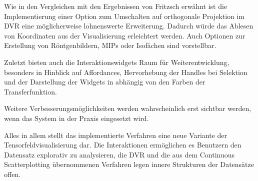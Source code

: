 \documentclass[a4paper,fontsize=12pt,toc=bib,halfparskip,ngerman]{scrartcl}
\begin{document}
Wie in den Vergleichen mit den Ergebnissen von Fritzsch erw\"ahnt ist die Implementierung einer Option zum Umschalten auf orthogonale Projektion im DVR eine m\"oglicherweise lohnenswerte Erweiterung. Dadurch w\"urde das Ablesen von Koordinaten aus der Visualisierung erleichtert werden. Auch Optionen zur Erstellung von R\"ontgenbildern, MIPs oder Isof\"achen sind vorstellbar.

Zuletzt bieten auch die Interaktionswidgets Raum f\"ur Weiterentwicklung, besonders in Hinblick auf Affordances, Hervorhebung der Handles bei Selektion und der Darstellung der Widgets in abh\"angig von den Farben der Transferfunktion.
 
Weitere Verbesserungsm\"oglichkeiten werden wahrscheinlich erst sichtbar werden, wenn das System in der Praxis eingesetzt wird. 

Alles in allem stellt das implementierte Verfahren eine neue Variante der Tensorfeldvisualisierung dar. Die Interaktionen erm\"oglichen es Benutzern den Datensatz explorativ zu analysieren, die DVR und die aus dem Continuous Scatterplotting \"ubernommenen Verfahren legen innere Strukturen der Datens\"atze offen.


\label{LastPageBeforeRefs}
\clearpage
{}

\printbibliography
\label{LastBibPage}
\end{document}

